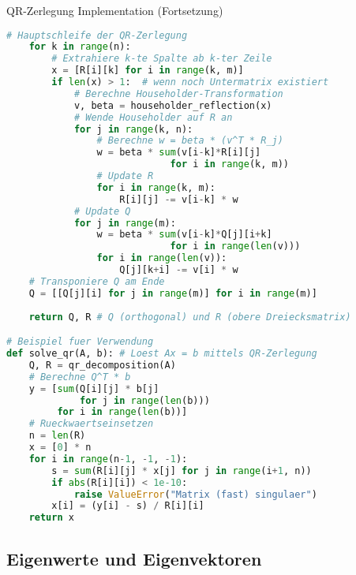 \begin{examplecode}{QR-Zerlegung Implementation (Fortsetzung)}
\begin{lstlisting}[language=Python, style=basesmol]
    # Hauptschleife der QR-Zerlegung
    for k in range(n):
        # Extrahiere k-te Spalte ab k-ter Zeile
        x = [R[i][k] for i in range(k, m)]
        if len(x) > 1:  # wenn noch Untermatrix existiert
            # Berechne Householder-Transformation
            v, beta = householder_reflection(x)
            # Wende Householder auf R an
            for j in range(k, n):
                # Berechne w = beta * (v^T * R_j)
                w = beta * sum(v[i-k]*R[i][j] 
                             for i in range(k, m))
                # Update R
                for i in range(k, m):
                    R[i][j] -= v[i-k] * w
            # Update Q
            for j in range(m):
                w = beta * sum(v[i-k]*Q[j][i+k] 
                             for i in range(len(v)))
                for i in range(len(v)):
                    Q[j][k+i] -= v[i] * w
    # Transponiere Q am Ende
    Q = [[Q[j][i] for j in range(m)] for i in range(m)]
    
    return Q, R # Q (orthogonal) und R (obere Dreiecksmatrix)

# Beispiel fuer Verwendung
def solve_qr(A, b): # Loest Ax = b mittels QR-Zerlegung
    Q, R = qr_decomposition(A)
    # Berechne Q^T * b
    y = [sum(Q[i][j] * b[j] 
             for j in range(len(b))) 
         for i in range(len(b))]
    # Rueckwaertseinsetzen
    n = len(R)
    x = [0] * n
    for i in range(n-1, -1, -1):
        s = sum(R[i][j] * x[j] for j in range(i+1, n))
        if abs(R[i][i]) < 1e-10:
            raise ValueError("Matrix (fast) singulaer")
        x[i] = (y[i] - s) / R[i][i]
    return x
\end{lstlisting}
\end{examplecode}

\subsection{Eigenwerte und Eigenvektoren}